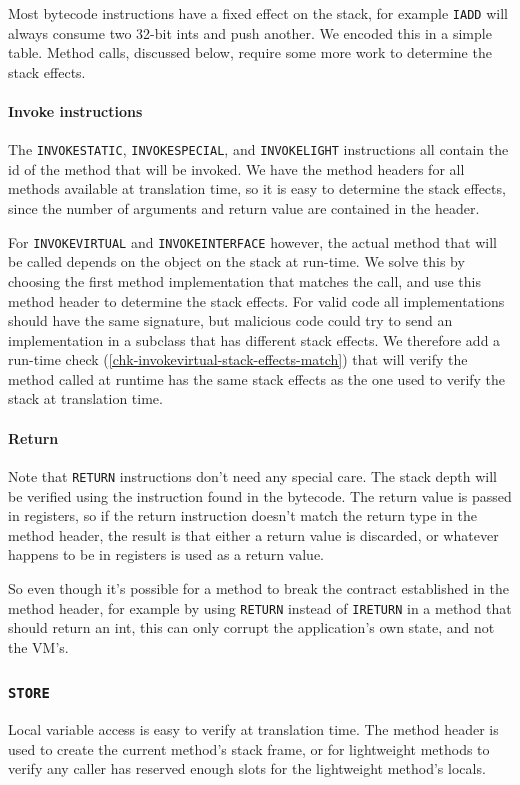 Most bytecode instructions have a fixed effect on the stack, for example \texttt{IADD} will always consume two 32-bit ints and push another. We encoded this in a simple table. Method calls, discussed below, require some more work to determine the stack effects. 

\paragraph{Invoke instructions}
The \texttt{INVOKESTATIC}, \texttt{INVOKESPECIAL}, and \texttt{INVOKELIGHT} instructions all contain the id of the method that will be invoked. We have the method headers for all methods available at translation time, so it is easy to determine the stack effects, since the number of arguments and return value are contained in the header.

For \texttt{INVOKEVIRTUAL} and \texttt{INVOKEINTERFACE} however, the actual method that will be called depends on the object on the stack at run-time. We solve this by choosing the first method implementation that matches the call, and use this method header to determine the stack effects. For valid code all implementations should have the same signature, but malicious code could try to send an implementation in a subclass that has different stack effects. We therefore add a run-time check (\ref{chk-invokevirtual-stack-effects-match}) that will verify the method called at runtime has the same stack effects as the one used to verify the stack at translation time.

\paragraph{Return}
Note that \texttt{RETURN} instructions don't need any special care. The stack depth will be verified using the instruction found in the bytecode. The return value is passed in registers, so if the return instruction doesn't match the return type in the method header, the result is that either a return value is discarded, or whatever happens to be in registers is used as a return value.

So even though it's possible for a method to break the contract established in the method header, for example by using \texttt{RETURN} instead of \texttt{IRETURN} in a method that should return an int, this can only corrupt the application's own state, and not the VM's.

\subsubsection{\texttt{STORE}}
Local variable access is easy to verify at translation time. The method header is used to create the current method's stack frame, or for lightweight methods to verify any caller has reserved enough slots for the lightweight method's locals.

